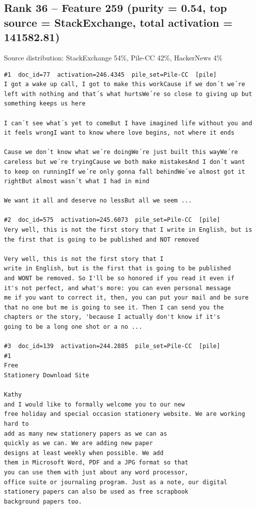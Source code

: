 \subsection*{Rank 36 -- Feature 259 (purity = 0.54, top source = StackExchange, total activation = 141582.81)}

Source distribution: StackExchange 54\%, Pile-CC 42\%, HackerNews 4\%

\begin{verbatim}
#1  doc_id=77  activation=246.4345  pile_set=Pile-CC  [pile]
I got a wake up call, I got to make this workCause if we don´t we´re left with nothing and that´s what hurtsWe´re so close to giving up but something keeps us here

I can´t see what´s yet to comeBut I have imagined life without you and it feels wrongI want to know where love begins, not where it ends

Cause we don´t know what we´re doingWe´re just built this wayWe´re careless but we´re tryingCause we both make mistakesAnd I don´t want to keep on runningIf we´re only gonna fall behindWe´ve almost got it rightBut almost wasn´t what I had in mind

We want it all and deserve no lessBut all we seem ...

#2  doc_id=575  activation=245.6073  pile_set=Pile-CC  [pile]
Very well, this is not the first story that I write in English, but is the first that is going to be published and NOT removed

Very well, this is not the first story that I
write in English, but is the first that is going to be published
and WONT be removed. So I'll be so honored if you read it even if
it's not perfect, and what's more: you can even personal message
me if you want to correct it, then, you can put your mail and be sure
that no one but me is going to see it. Then I can send you the
chapters or the story, 'because I actually don't know if it's
going to be a long one shot or a no ...

#3  doc_id=139  activation=244.2885  pile_set=Pile-CC  [pile]
#1
Free
Stationery Download Site

Kathy
and I would like to formally welcome you to our new
free holiday and special occasion stationery website. We are working hard to
add as many new stationery papers as we can as
quickly as we can. We are adding new paper
designs at least weekly when possible. We add
them in Microsoft Word, PDF and a JPG format so that
you can use them with just about any word processor,
office suite or journaling program. Just as a note, our digital
stationery papers can also be used as free scrapbook
background papers too.


\end{verbatim}
